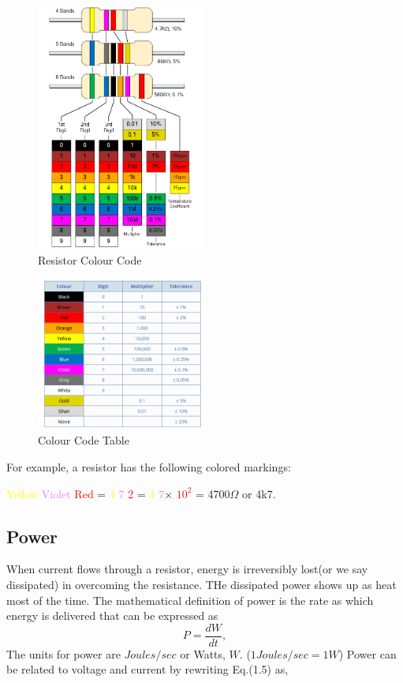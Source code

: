\documentclass[a4 paper]{article}
\newcommand{\red}[1]{\textcolor{red}{#1}}
\newcommand{\yellow}[1]{\textcolor{yellow}{#1}}
\newcommand{\violet}[1]{\textcolor{violet}{#1}}
\numberwithin{equation}{section}
\newcommand{\0}{\mathbf{0}}
\begin{document}
\begin{figure}[!ht]
  \caption{Resistor Colour Code}
  \centering
  \includegraphics[width=0.5\textwidth]{./images/ColourCode1}
\end{figure}

\vspace{8 mm}

\begin{figure}[!ht]
  \caption{Colour Code Table}
  \centering
  \includegraphics[width=0.5\textwidth]{./images/ColourCode2}
\end{figure}
For example, a resistor has the following colored markings: \newline
\centerline{\yellow{Yellow} \violet{Violet} \red{Red} = \yellow{4} \violet{7} \red{2} = \yellow{4} \violet{7}$\times$ \red{$10^2$} = 4700$\Omega$ or 4k7.
}

\subsection{Power}
When current flows through a resistor, energy is irreversibly lost(or we say dissipated) in overcoming the resistance. THe dissipated power shows up as heat most of the time. The mathematical definition of power is the rate as which energy is delivered that can be expressed as
\begin{equation}
P = \frac{dW}{dt},
\end{equation}
The units for power are $Joules/sec$ or Watts, $W$. ($1 Joules/sec = 1 W$) 
Power can be related to voltage and current by rewriting Eq.(1.5) as, 
\end{document}
